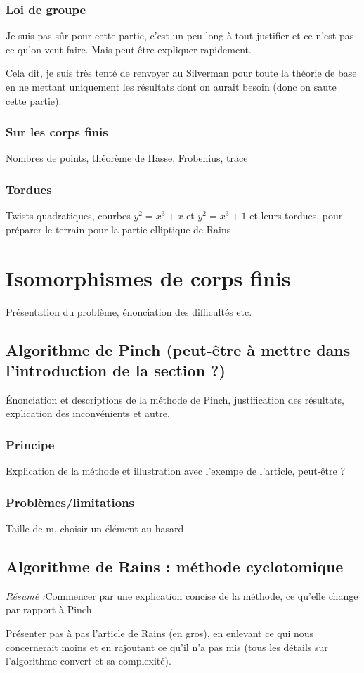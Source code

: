 \documentclass[a4paper]{article} %
\numberwithin{equation}{section}
\begin{document}
\subsubsection{Loi de groupe}
Je suis pas sûr pour cette partie, c'est un peu long à tout justifier et ce
n'est pas ce qu'on veut faire. Mais peut-être expliquer rapidement.\par
Cela dit, je suis très tenté de renvoyer au Silverman pour toute la théorie de
base en ne mettant uniquement les résultats dont on aurait besoin (donc on saute
cette partie).
\subsubsection{Sur les corps finis}
Nombres de points, théorème de Hasse, Frobenius, trace
\subsubsection{Tordues}
Twists quadratiques, courbes $y^2 = x^3 + x$ et $y^2 = x^3 + 1$ et leurs
tordues, pour préparer le terrain pour la partie elliptique de Rains


\section{Isomorphismes de corps finis}
Présentation du problème, énonciation des difficultés etc.

\subsection{Algorithme de Pinch (peut-être à mettre dans l'introduction de 
la section ?)}
Énonciation et descriptions de la méthode de Pinch, justification des 
résultats, explication des inconvénients et autre.
\subsubsection{Principe}
Explication de la méthode et illustration avec l'exempe de l'article, peut-être
?
\subsubsection{Problèmes/limitations}
Taille de m, choisir un élément au hasard

\subsection{Algorithme de Rains : méthode cyclotomique}
\textit{Résumé :}Commencer par une explication concise de la méthode, ce 
qu'elle change par rapport à Pinch.\par
Présenter pas à pas l'article de Rains (en gros), en enlevant ce qui nous 
concernerait moins et en rajoutant ce qu'il n'a pas mis (tous les détails 
sur l'algorithme convert et sa complexité).
\end{document}
